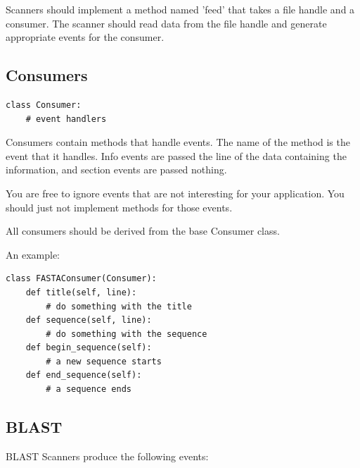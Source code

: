\documentclass{report}
\begin{document}
Scanners should implement a method named 'feed' that takes a file
handle and a consumer.  The scanner should read data from the file
handle and generate appropriate events for the consumer.

\subsection{Consumers}

\begin{verbatim}
class Consumer:
    # event handlers
\end{verbatim}

Consumers contain methods that handle events.  The name of the method
is the event that it handles.  Info events are passed the line of the
data containing the information, and section events are passed
nothing.

You are free to ignore events that are not interesting for your
application.  You should just not implement methods for those events.

All consumers should be derived from the base Consumer class.

An example:

\begin{verbatim}
class FASTAConsumer(Consumer):
    def title(self, line):
        # do something with the title
    def sequence(self, line):
        # do something with the sequence
    def begin_sequence(self):
        # a new sequence starts
    def end_sequence(self):
        # a sequence ends
\end{verbatim}

\subsection{BLAST}

BLAST Scanners produce the following events:
\end{document}
